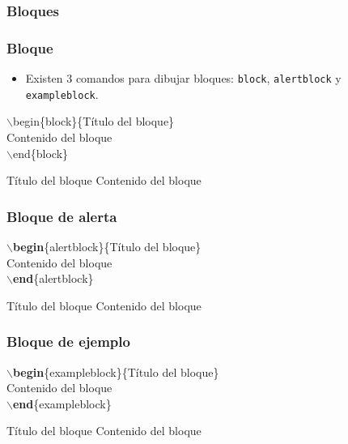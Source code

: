 \documentclass[aspectratio=43]{beamer}%
\begin{document}
\subsubsection{Bloques}
\begin{frame}[fragile]
\frametitle{\textbf{Bloque}}
\justifying
 \begin{itemize}\justifying
  \item Existen 3 comandos para dibujar bloques: \texttt{block}, \texttt{alertblock} y \texttt{exampleblock}.
\end{itemize}

$\backslash$begin\{block\}\{Título del bloque\}\\
Contenido del bloque\\
$\backslash$end\{block\}

\begin{block}{Título del bloque}
Contenido del bloque
\end{block}


\end{frame}


\begin{frame}[fragile]
\frametitle{\textbf{Bloque de alerta}}
\justifying
 $\backslash$\textbf{begin}\{alertblock\}\{Título del bloque\}\\
Contenido del bloque\\
$\backslash$\textbf{end}\{alertblock\}

\begin{alertblock}{Título del bloque}
Contenido del bloque
\end{alertblock}

\end{frame}

\begin{frame}[fragile]
\frametitle{\textbf{Bloque de ejemplo}}
\justifying
 $\backslash$\textbf{begin}\{exampleblock\}\{Título del bloque\}\\
Contenido del bloque\\
$\backslash$\textbf{end}\{exampleblock\}

\begin{exampleblock}{Título del bloque}
Contenido del bloque
\end{exampleblock}

\end{frame}
\end{document}
